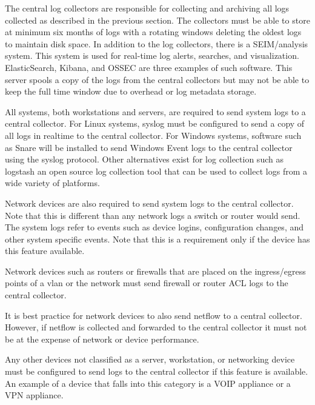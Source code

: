 The central log collectors are responsible for collecting and archiving all logs
collected as described in the previous section. The collectors must be able to
store at minimum six months of logs with a rotating windows deleting the oldest
logs to maintain disk space. In addition to the log collectors, there is a SEIM/analysis
system. This system is used for real-time log alerts, searches, and
visualization. ElasticSearch, Kibana, and OSSEC are three examples of such
software. This server spools a copy of the logs from the central collectors but
may not be able to keep the full time window due to overhead or log metadata
storage.

All systems, both workstations and servers, are required to send system logs to
a central collector. For Linux systems, syslog must be configured to send a copy
of all logs in realtime to the central collector. For Windows systems, software
such as Snare will be installed to send Windows Event logs to the central
collector using the syslog protocol. Other alternatives exist for log collection
such as logstash an open source log collection tool that can be used to collect
logs from a wide variety of platforms.

Network devices are also required to send system logs to the central collector.
Note that this is different than any network logs a switch or router would send.
The system logs refer to events such as device logins, configuration changes, and
other system specific events. Note that this is a requirement only if the device
has this feature available.

Network devices such as routers or firewalls that are placed on the ingress/egress
points of a vlan or the network must send firewall or router ACL logs to the
central collector.

It is best practice for network devices to also send netflow to a central
collector. However, if netflow is collected and forwarded to the central
collector it must not be at the expense of network or device performance.

Any other devices not classified as a server, workstation, or networking device
must be configured to send logs to the central collector if this feature is
available. An example of a device that falls into this category is a VOIP appliance
 or a VPN appliance.
